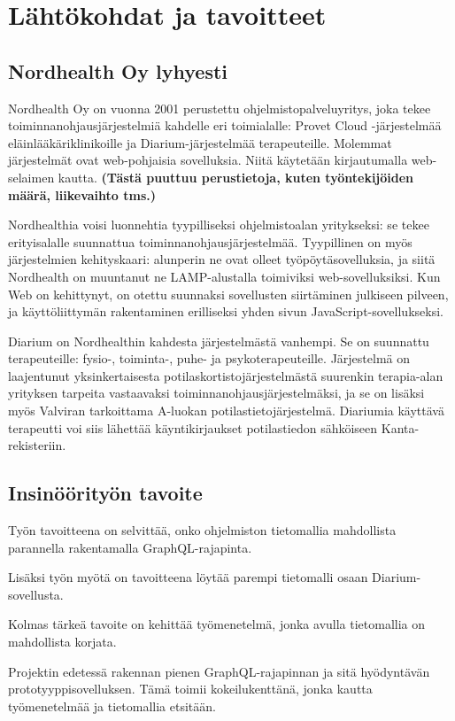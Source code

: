 \hypertarget{luxe4htuxf6kohdat-ja-tavoitteet}{%
\chapter{Lähtökohdat ja
tavoitteet}\label{luxe4htuxf6kohdat-ja-tavoitteet}}

\hypertarget{nordhealth-oy-lyhyesti}{%
\section{Nordhealth Oy lyhyesti}\label{nordhealth-oy-lyhyesti}}

Nordhealth Oy on vuonna 2001 perustettu ohjelmistopalveluyritys, joka
tekee toiminnanohjausjärjestelmiä kahdelle eri toimialalle: Provet Cloud
-järjestelmää eläinlääkäriklinikoille ja Diarium-järjestelmää
terapeuteille. Molemmat järjestelmät ovat web-pohjaisia sovelluksia.
Niitä käytetään kirjautumalla web-selaimen kautta. \textbf{(Tästä
puuttuu perustietoja, kuten työntekijöiden määrä, liikevaihto tms.)}

Nordhealthia voisi luonnehtia tyypilliseksi ohjelmistoalan yritykseksi:
se tekee erityisalalle suunnattua toiminnanohjausjärjestelmää.
Tyypillinen on myös järjestelmien kehityskaari: alunperin ne ovat olleet
työpöytäsovelluksia, ja siitä Nordhealth on muuntanut ne LAMP-alustalla
toimiviksi web-sovelluksiksi. Kun Web on kehittynyt, on otettu suunnaksi
sovellusten siirtäminen julkiseen pilveen, ja käyttöliittymän
rakentaminen erilliseksi yhden sivun JavaScript-sovellukseksi.

Diarium on Nordhealthin kahdesta järjestelmästä vanhempi. Se on
suunnattu terapeuteille: fysio-, toiminta-, puhe- ja psykoterapeuteille.
Järjestelmä on laajentunut yksinkertaisesta
potilaskortistojärjestelmästä suurenkin terapia-alan yrityksen tarpeita
vastaavaksi toiminnanohjausjärjestelmäksi, ja se on lisäksi myös
Valviran tarkoittama A-luokan potilastietojärjestelmä. Diariumia
käyttävä terapeutti voi siis lähettää käyntikirjaukset potilastiedon
sähköiseen Kanta-rekisteriin.

\hypertarget{insinuxf6uxf6rityuxf6n-tavoite}{%
\section{Insinöörityön tavoite}\label{insinuxf6uxf6rityuxf6n-tavoite}}

Työn tavoitteena on selvittää, onko ohjelmiston tietomallia mahdollista
parannella rakentamalla GraphQL-rajapinta.

Lisäksi työn myötä on tavoitteena löytää parempi tietomalli osaan
Diarium-sovellusta.

Kolmas tärkeä tavoite on kehittää työmenetelmä, jonka avulla tietomallia
on mahdollista korjata.

Projektin edetessä rakennan pienen GraphQL-rajapinnan ja sitä
hyödyntävän prototyyppisovelluksen. Tämä toimii kokeilukenttänä, jonka
kautta työmenetelmää ja tietomallia etsitään.
